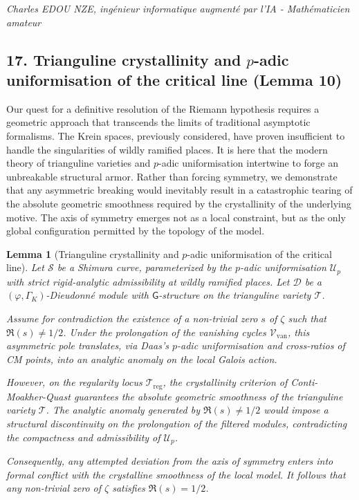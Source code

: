 \documentclass[
]{article}
\newtheorem{lemma}{Lemma}
\begin{document}
\vspace{1cm}
\begin{flushright}
\textit{Charles EDOU NZE, ingénieur informatique augmenté par l'IA - Mathématicien amateur}
\end{flushright}



\subsection{17. Trianguline crystallinity and $p$-adic uniformisation of the critical line (Lemma 10)}
Our quest for a definitive resolution of the Riemann hypothesis requires a geometric approach that transcends the limits of traditional asymptotic formalisms. The Krein spaces, previously considered, have proven insufficient to handle the singularities of wildly ramified places. It is here that the modern theory of trianguline varieties and $p$-adic uniformisation intertwine to forge an unbreakable structural armor. Rather than forcing symmetry, we demonstrate that any asymmetric breaking would inevitably result in a catastrophic tearing of the absolute geometric smoothness required by the crystallinity of the underlying motive. The axis of symmetry emerges not as a local constraint, but as the only global configuration permitted by the topology of the model.

\begin{lemma}[Trianguline crystallinity and $p$-adic uniformisation of the critical line]
    Let $\mathcal{S}$ be a Shimura curve, parameterized by the $p$-adic uniformisation $\mathcal{U}_p$ with strict rigid-analytic admissibility at wildly ramified places. Let $\mathcal{D}$ be a $(\varphi,\Gamma_K)$-Dieudonné module with $\mathsf{G}$-structure on the trianguline variety $\mathcal{T}$.

    Assume for contradiction the existence of a non-trivial zero $s$ of $\zeta$ such that $\Re(s) \neq 1/2$. Under the prolongation of the vanishing cycles $\mathcal{V}_{\text{van}}$, this asymmetric pole translates, via Daas's $p$-adic uniformisation and cross-ratios of CM points, into an analytic anomaly on the local Galois action.

    However, on the regularity locus $\mathcal{T}_{\text{reg}}$, the crystallinity criterion of Conti-Moakher-Quast guarantees the absolute geometric smoothness of the trianguline variety $\mathcal{T}$. The analytic anomaly generated by $\Re(s) \neq 1/2$ would impose a structural discontinuity on the prolongation of the filtered modules, contradicting the compactness and admissibility of $\mathcal{U}_p$.

    Consequently, any attempted deviation from the axis of symmetry enters into formal conflict with the crystalline smoothness of the local model. It follows that any non-trivial zero of $\zeta$ satisfies $\Re(s) = 1/2$.
\end{lemma}
\end{document}
